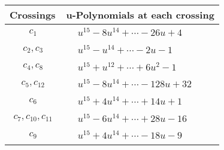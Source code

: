 \documentclass[1p]{elsarticle_modified}
\theoremstyle{definition}
\begin{document}
\begin{tabular}{m{50pt}|m{274pt}}
Crossings & \hspace{64pt}u-Polynomials at each crossing \\
\hline $$\begin{aligned}c_{1}\end{aligned}$$&$\begin{aligned}
&u^{15}-8 u^{14}+\cdots-26 u+4
\end{aligned}$\\
\hline $$\begin{aligned}c_{2},c_{3}\end{aligned}$$&$\begin{aligned}
&u^{15}- u^{14}+\cdots-2 u-1
\end{aligned}$\\
\hline $$\begin{aligned}c_{4},c_{8}\end{aligned}$$&$\begin{aligned}
&u^{15}+u^{12}+\cdots+6 u^2-1
\end{aligned}$\\
\hline $$\begin{aligned}c_{5},c_{12}\end{aligned}$$&$\begin{aligned}
&u^{15}-8 u^{14}+\cdots-128 u+32
\end{aligned}$\\
\hline $$\begin{aligned}c_{6}\end{aligned}$$&$\begin{aligned}
&u^{15}+4 u^{14}+\cdots+14 u+1
\end{aligned}$\\
\hline $$\begin{aligned}c_{7},c_{10},c_{11}\end{aligned}$$&$\begin{aligned}
&u^{15}-6 u^{14}+\cdots+28 u-16
\end{aligned}$\\
\hline $$\begin{aligned}c_{9}\end{aligned}$$&$\begin{aligned}
&u^{15}+4 u^{14}+\cdots-18 u-9
\end{aligned}$\\
\hline
\end{tabular}\\~\\
\newpage\renewcommand{\arraystretch}{1}
\end{document}
